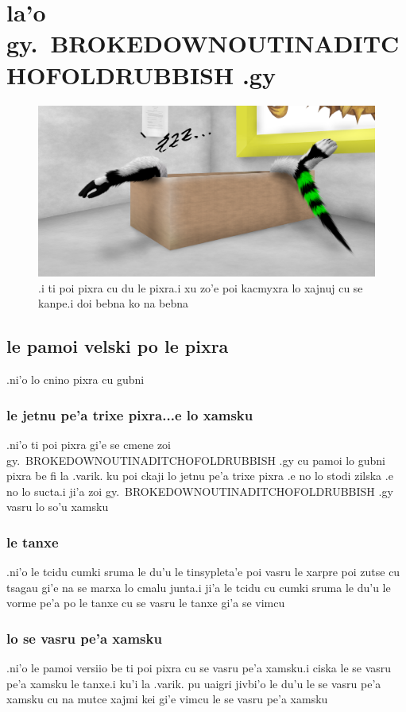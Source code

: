 \documentclass{report}
\begin{document}
\chapter{la'o gy.\ BROKEDOWNOUTINADITCHOFOLDRUBBISH .gy}
\begin{figure}[ht]
	\centering
	\includegraphics[width=\textwidth]{brokedownoutinaditchofoldrubbish/brokedownoutinaditchofoldrubbish.png}
	\caption[center]{.i ti poi pixra cu du le pixra\@  .i xu zo'e poi kacmyxra lo xajnuj cu se kanpe\@  .i doi bebna ko na bebna}
\end{figure}
\section{le pamoi velski po le pixra}
.ni'o lo cnino pixra cu gubni
\subsection{le jetnu pe'a trixe pixra...e lo xamsku}
.ni'o ti poi pixra gi'e se cmene zoi gy.\ BROKEDOWNOUTINADITCHOFOLDRUBBISH .gy cu pamoi lo gubni pixra be fi la .varik. ku poi ckaji lo jetnu pe'a trixe pixra .e no lo stodi zilska .e no lo sucta\@  .i ji'a zoi gy.\ BROKEDOWNOUTINADITCHOFOLDRUBBISH .gy vasru lo so'u xamsku
\subsection{le tanxe}
.ni'o le tcidu cumki sruma le du'u le tinsypleta'e poi vasru le xarpre poi zutse cu tsagau gi'e na se marxa lo cmalu junta\@  .i ji'a le tcidu cu cumki sruma le du'u le vorme pe'a po le tanxe cu se vasru le tanxe gi'a se vimcu
\subsection{lo se vasru pe'a xamsku}
.ni'o le pamoi versiio be ti poi pixra cu se vasru pe'a xamsku\@  .i ciska le se vasru pe'a xamsku le tanxe\@  .i ku'i la .varik. pu uaigri jivbi'o le du'u le se vasru pe'a xamsku cu na mutce xajmi kei gi'e vimcu le se vasru pe'a xamsku
\end{document}
